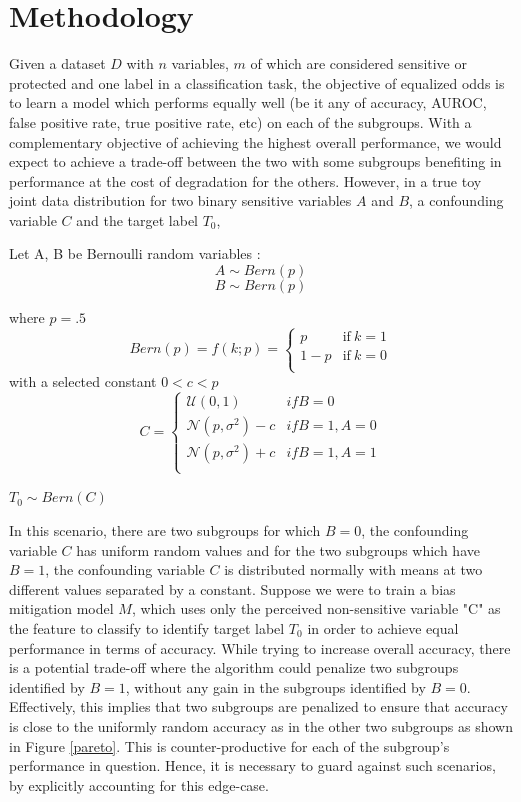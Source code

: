 \section{Methodology}

Given a dataset $D$ with $n$ variables, $m$ of which are considered sensitive or protected and one label in a classification task, the objective of equalized odds is to learn a model which performs equally well (be it any of accuracy, AUROC, false positive rate, true positive rate, etc) on each of the subgroups. With a complementary objective of achieving the highest overall performance, we would expect to achieve a trade-off between the two with some subgroups benefiting in performance at the cost of degradation for the others. However, in a true toy joint data distribution for two binary sensitive variables $A$ and $B$, a confounding variable $C$ and the target label $T_0$, \\
\begin{center}
Let A, B be Bernoulli random variables :
\[A \sim Bern(p)\]
\[B \sim Bern(p)\]

where $p=.5$
\begin{equation}
    Bern(p) = f(k;p) =
    \left\{
        \begin{array}{cc}
                p & \mathrm{if\ } k=1 \\
                1-p & \mathrm{if\ } k=0 \\
        \end{array} 
    \right.
\end{equation}
with a selected constant $0<c<p$
\[ C = 
\begin{cases}
\mathcal{U}(0,1) & if B = 0\\
\mathcal{N}(p, \sigma^2) - c & if B = 1, A= 0\\
\mathcal{N}(p, \sigma^2) + c & if B = 1, A= 1 \\
\end{cases}
\]

$T_0 \sim Bern(C)$ \\
\end{center}
In this scenario, there are two subgroups for which $B=0$, the confounding variable $C$ has uniform random values and for the two subgroups which have $B=1$, the confounding variable $C$ is distributed normally with means at two different values separated by a constant. Suppose we were to train a bias mitigation model $M$, which uses only the perceived non-sensitive variable "C" as the feature to classify to identify target label $T_0$  in order to achieve equal performance in terms of accuracy. While trying to increase overall accuracy, there is a potential trade-off where the algorithm could penalize two subgroups identified by $B=1$, without any gain in the subgroups identified by $B=0$. Effectively, this implies that two subgroups are penalized to ensure that accuracy is close to the uniformly random accuracy as in the other two subgroups as shown in Figure \ref{pareto}. This is counter-productive for each of the subgroup's performance in question. Hence, it is necessary to guard against such scenarios, by explicitly accounting for this edge-case.

